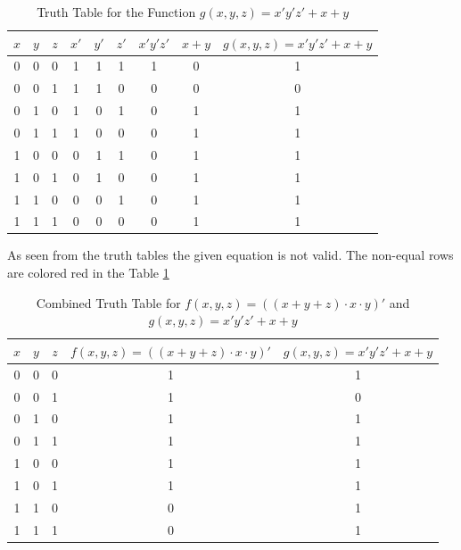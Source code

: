 \documentclass[table]{article}
\begin{document}
\begin{enumerate}[label=\textbf{\arabic*.}]
\begin{enumerate}[label=\textbf{\alph*.}]
        \begin{table}[h]
            \centering
            \caption{Truth Table for the Function \( g(x, y, z) = x' y' z' + x + y \)}
            \begin{tabular}{|c|c|c|c|c|c|c|c|c|}
                \hline
                \( x \) & \( y \) & \( z \) & \( x' \) & \( y' \) & \( z' \) & \( x' y' z' \) & \( x + y \) & \( g(x, y, z) = x' y' z' + x + y \) \\
                \hline
                0 & 0 & 0 & 1 & 1 & 1 & 1 & 0 & 1 \\
                0 & 0 & 1 & 1 & 1 & 0 & 0 & 0 & 0 \\
                0 & 1 & 0 & 1 & 0 & 1 & 0 & 1 & 1 \\
                0 & 1 & 1 & 1 & 0 & 0 & 0 & 1 & 1 \\
                1 & 0 & 0 & 0 & 1 & 1 & 0 & 1 & 1 \\
                1 & 0 & 1 & 0 & 1 & 0 & 0 & 1 & 1 \\
                1 & 1 & 0 & 0 & 0 & 1 & 0 & 1 & 1 \\
                1 & 1 & 1 & 0 & 0 & 0 & 0 & 1 & 1 \\
                \hline
            \end{tabular}
        \end{table}

        As seen from the truth tables the given equation is not valid. The non-equal rows are colored red in the Table \ref{tab:combined-table}\\

        \begin{table}[h]
            \centering
            \caption{Combined Truth Table for \( f(x, y, z) = \left( (x + y + z) \cdot x \cdot y \right)' \) and \( g(x, y, z) = x' y' z' + x + y \)}
            \label{tab:combined-table}
            \begin{tabular}{|c|c|c|c|c|}
                \hline
                \( x \) & \( y \) & \( z \) & \( f(x, y, z) = \left( (x + y + z) \cdot x \cdot y \right)' \) & \( g(x, y, z) = x' y' z' + x + y \) \\
                \hline
                0 & 0 & 0 & 1 & 1 \\
               \rowcolor{red} 0 & 0 & 1 & 1 & 0 \\
                0 & 1 & 0 & 1 & 1 \\
                0 & 1 & 1 & 1 & 1 \\
                1 & 0 & 0 & 1 & 1 \\
                1 & 0 & 1 & 1 & 1 \\
                \rowcolor{red} 1 & 1 & 0 & 0 & 1 \\
                \rowcolor{red} 1 & 1 & 1 & 0 & 1 \\
                \hline
            \end{tabular}
        \end{table}
        

\end{enumerate}
\end{enumerate}
\end{document}
